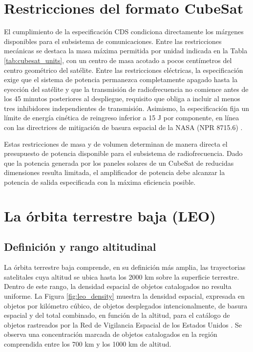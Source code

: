 \section{Restricciones del formato CubeSat}
\label{sec:restricciones_cubesat}
El cumplimiento de la especificación CDS condiciona directamente los márgenes disponibles para el subsistema de comunicaciones. Entre las restricciones mecánicas se destaca la masa máxima permitida por unidad indicada en la Tabla \ref{tab:cubesat_units}, con un centro de masa acotado a pocos centímetros del centro geométrico del satélite. Entre las restricciones eléctricas, la especificación exige que el sistema de potencia permanezca completamente apagado hasta la eyección del satélite y que la transmisión de radiofrecuencia no comience antes de los 45 minutos posteriores al despliegue, requisito que obliga a incluir al menos tres inhibidores independientes de transmisión. Asimismo, la especificación fija un límite de energía cinética de reingreso inferior a 15 J por componente, en línea con las directrices de mitigación de basura espacial de la NASA (NPR 8715.6) \cite{cubesatspecs}.

Estas restricciones de masa y de volumen determinan de manera directa el presupuesto de potencia disponible para el subsistema de radiofrecuencia. Dado que la potencia generada por los paneles solares de un CubeSat de reducidas dimensiones resulta limitada, el amplificador de potencia debe alcanzar la potencia de salida especificada con la máxima eficiencia posible.

\section{La órbita terrestre baja (LEO)}
\subsection{Definición y rango altitudinal}
La órbita terrestre baja comprende, en su definición más amplia, las trayectorias satelitales cuya altitud se ubica hasta los 2000 km sobre la superficie terrestre. Dentro de este rango, la densidad espacial de objetos catalogados no resulta uniforme. La Figura \ref{fig:leo_density} muestra la densidad espacial, expresada en objetos por kilómetro cúbico, de objetos desplegados intencionalmente, de basura espacial y del total combinado, en función de la altitud, para el catálogo de objetos rastreados por la Red de Vigilancia Espacial de los Estados Unidos \cite{anzmeador2018}. Se observa una concentración marcada de objetos catalogados en la región comprendida entre los 700 km y los 1000 km de altitud.
 
